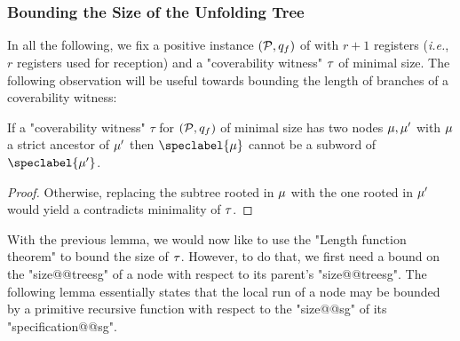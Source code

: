 \subsubsection{Bounding the Size of the Unfolding Tree}
In all the following, we fix a positive instance $(\mathcal{P},q_f)$ of \COVER with $r+1$ registers (\emph{i.e.}, $r$ registers used for reception) and a  "coverability witness" $\tau$ of minimal size.
The following observation will be useful towards bounding the length of branches of a coverability witness:

\begin{lemma}
\label{lem:no_subword_in_branch_sg}
If a "coverability witness" $\tau$ for $(\mathcal{P}, q_f)$ of minimal size has two nodes $\mu, \mu'$ with $\mu$ a strict ancestor of $\mu'$ then  $\speclabel{\node}$ cannot be a subword of $\speclabel{\node'}$. 
\end{lemma}
\begin{proof}
Otherwise, replacing the subtree rooted in $\mu$ with the one rooted in $\mu'$ would yield a  contradicts minimality of $\tau$.
\end{proof}

With the previous lemma, we would now like to use the "Length function theorem" to bound the size of $\tau$. However, to do that, we first need a bound on the "size@@treesg" of a node with respect to its parent's "size@@treesg". The following lemma essentially states that the local run of a node may be bounded by a primitive recursive function with respect to the "size@@sg" of its "specification@@sg".

